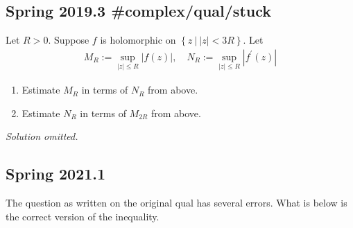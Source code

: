 \hypertarget{spring-2019.3-complexqualstuck}{%
\subsection{Spring 2019.3
\#complex/qual/stuck}\label{spring-2019.3-complexqualstuck}}

\begin{problem}[?]

Let \(R>0\). Suppose \(f\) is holomorphic on
\(\left\{{z{~\mathrel{\Big\vert}~}{\left\lvert {z} \right\rvert} < 3R}\right\}\).
Let
\begin{align*}
M_{R}:=\sup _{|z| \leq R}|f(z)|, \quad N_{R}:=\sup _{|z| \leq R}\left|f^{\prime}(z)\right|
\end{align*}

\begin{enumerate}
\def\labelenumi{\alph{enumi}.}
\item
  Estimate \(M_{R}\) in terms of \(N_{R}\) from above.
\item
  Estimate \(N_{R}\) in terms of \(M_{2 R}\) from above.
\end{enumerate}

\end{problem}

\emph{Solution omitted.}

\hypertarget{spring-2021.1}{%
\subsection{Spring 2021.1}\label{spring-2021.1}}

\begin{warnings}

The question as written on the original qual has several errors. What is
below is the correct version of the inequality.

\end{warnings}

